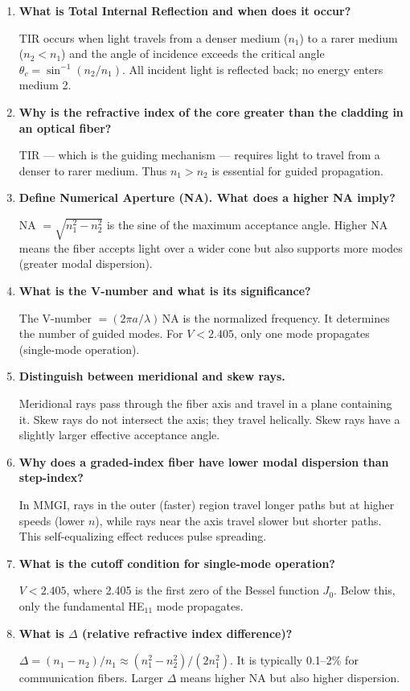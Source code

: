 \documentclass[12pt,a4paper]{article}
\newcommand{\Q}[1]{\textbf{#1}\par\noindent\ignorespaces}
\begin{document}
\begin{tcolorbox}[exambox, title={\textbf{Frequently Asked / Viva Questions}}]
\begin{enumerate}[topsep=0pt, label=\textbf{Q\arabic*.}, itemsep=5pt]
  \item \Q{What is Total Internal Reflection and when does it occur?}
    TIR occurs when light travels from a denser medium ($n_1$) to a rarer medium ($n_2 < n_1$) and the angle of incidence exceeds the critical angle $\theta_c = \sin^{-1}(n_2/n_1)$. All incident light is reflected back; no energy enters medium 2.
  \item \Q{Why is the refractive index of the core greater than the cladding in an optical fiber?}
    TIR --- which is the guiding mechanism --- requires light to travel from a denser to rarer medium. Thus $n_1 > n_2$ is essential for guided propagation.
  \item \Q{Define Numerical Aperture (NA). What does a higher NA imply?}
    NA $= \sqrt{n_1^2 - n_2^2}$ is the sine of the maximum acceptance angle. Higher NA means the fiber accepts light over a wider cone but also supports more modes (greater modal dispersion).
  \item \Q{What is the V-number and what is its significance?}
    The V-number $= (2\pi a / \lambda)\,\text{NA}$ is the normalized frequency. It determines the number of guided modes. For $V < 2.405$, only one mode propagates (single-mode operation).
  \item \Q{Distinguish between meridional and skew rays.}
    Meridional rays pass through the fiber axis and travel in a plane containing it. Skew rays do not intersect the axis; they travel helically. Skew rays have a slightly larger effective acceptance angle.
  \item \Q{Why does a graded-index fiber have lower modal dispersion than step-index?}
    In MMGI, rays in the outer (faster) region travel longer paths but at higher speeds (lower $n$), while rays near the axis travel slower but shorter paths. This self-equalizing effect reduces pulse spreading.
  \item \Q{What is the cutoff condition for single-mode operation?}
    $V < 2.405$, where 2.405 is the first zero of the Bessel function $J_0$. Below this, only the fundamental HE$_{11}$ mode propagates.
  \item \Q{What is $\Delta$ (relative refractive index difference)?}
    $\Delta = (n_1 - n_2)/n_1 \approx (n_1^2 - n_2^2)/(2n_1^2)$. It is typically 0.1--2\% for communication fibers. Larger $\Delta$ means higher NA but also higher dispersion.

\end{enumerate}
\end{tcolorbox}
\end{document}
